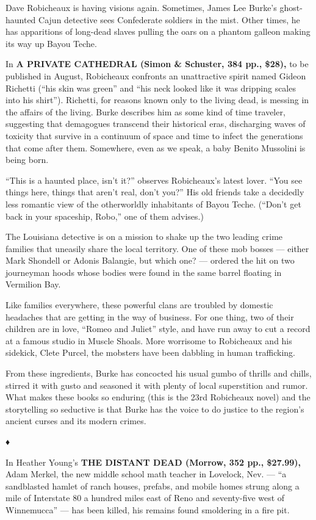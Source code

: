 Dave Robicheaux is having visions again. Sometimes, James Lee Burke's
ghost-haunted Cajun detective sees Confederate soldiers in the mist.
Other times, he has apparitions of long-dead slaves pulling the oars on
a phantom galleon making its way up Bayou Teche.

In \textbf{A PRIVATE CATHEDRAL (Simon \& Schuster, 384 pp., \$28),} to
be published in August, Robicheaux confronts an unattractive spirit
named Gideon Richetti (``his skin was green'' and ``his neck looked like
it was dripping scales into his shirt''). Richetti, for reasons known
only to the living dead, is messing in the affairs of the living. Burke
describes him as some kind of time traveler, suggesting that demagogues
transcend their historical eras, discharging waves of toxicity that
survive in a continuum of space and time to infect the generations that
come after them. Somewhere, even as we speak, a baby Benito Mussolini is
being born.

``This is a haunted place, isn't it?'' observes Robicheaux's latest
lover. ``You see things here, things that aren't real, don't you?'' His
old friends take a decidedly less romantic view of the otherworldly
inhabitants of Bayou Teche. (``Don't get back in your spaceship, Robo,''
one of them advises.)

The Louisiana detective is on a mission to shake up the two leading
crime families that uneasily share the local territory. One of these mob
bosses --- either Mark Shondell or Adonis Balangie, but which one? ---
ordered the hit on two journeyman hoods whose bodies were found in the
same barrel floating in Vermilion Bay.

Like families everywhere, these powerful clans are troubled by domestic
headaches that are getting in the way of business. For one thing, two of
their children are in love, ``Romeo and Juliet'' style, and have run
away to cut a record at a famous studio in Muscle Shoals. More worrisome
to Robicheaux and his sidekick, Clete Purcel, the mobsters have been
dabbling in human trafficking.

From these ingredients, Burke has concocted his usual gumbo of thrills
and chills, stirred it with gusto and seasoned it with plenty of local
superstition and rumor. What makes these books so enduring (this is the
23rd Robicheaux novel) and the storytelling so seductive is that Burke
has the voice to do justice to the region's ancient curses and its
modern crimes.

♦

In Heather Young's \textbf{THE DISTANT DEAD (Morrow, 352 pp., \$27.99),}
Adam Merkel, the new middle school math teacher in Lovelock, Nev. ---
``a sandblasted hamlet of ranch houses, prefabs, and mobile homes strung
along a mile of Interstate 80 a hundred miles east of Reno and
seventy-five west of Winnemucca'' --- has been killed, his remains found
smoldering in a fire pit.

